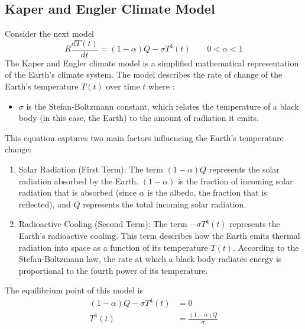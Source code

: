 \documentclass[]{article}
\begin{document}
\subsection{Kaper and Engler Climate Model}
Consider the next model
\[
    R \frac{dT(t)}{dt} = (1-\alpha)Q - \sigma T^4(t) \qquad 0<\alpha <1
\]
The Kaper and Engler climate model is a simplified mathematical representation of the Earth's climate system.
The model describes the rate of change of the Earth's temperature $T(t)$ over time $t$ where :

\begin{itemize}
    \item $\sigma$ is the Stefan-Boltzmann constant, which relates the temperature of a black body (in this case, the Earth) to the amount of radiation it emits.
\end{itemize}
\newpage
This equation captures two main factors influencing the Earth's temperature change:
\begin{enumerate}
    \item Solar Radiation (First Term): The term $(1-\alpha)Q$ represents the solar radiation absorbed by the Earth.
          $(1-\alpha)$ is the fraction of incoming solar radiation that is absorbed (since $\alpha$ is the albedo, the fraction that is reflected),
          and $Q$ represents the total incoming solar radiation.
    \item Radioactive Cooling (Second Term): The term $-\sigma T^4(t)$ represents the Earth's radioactive cooling.
          This term describes how the Earth emits thermal radiation into space as a function of its temperature $T(t)$.
          According to the Stefan-Boltzmann law, the rate at which a black body radiates energy is proportional to the fourth power of its temperature.
\end{enumerate}


The equilibrium point of this model is
\begin{align*}
    (1-\alpha)Q - \sigma T^4(t) & = 0
    \\
    T^4(t)                      & = \frac{(1-\alpha)Q}{\sigma}
\end{align*}
\end{document}
